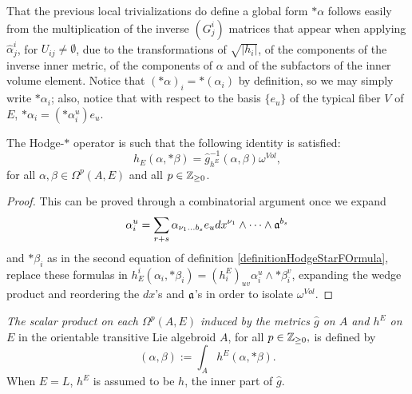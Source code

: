 That the previous local trivializations do define a global form $*\alpha$ follows easily from the multiplication of the inverse $(G^i_j)$ matrices that appear when applying $\hat \alpha^i_j$, for $U_{ij} \neq \emptyset$, due to the transformations of $\sqrt{|h_i|}$, of the components of the inverse inner metric, of the components of $\alpha$ and of the subfactors of the inner volume element. Notice that $(*\alpha)_i = *(\alpha_i)$ by definition, so we may simply write $*\alpha_i$; also, notice that with respect to the basis $\{e_u\}$ of the typical fiber $V$ of $E$, $*\alpha_i = (*\alpha_i^u)e_u$.

\begin{proposition}\label{propositionRelationHodgeStarAndInverseMetricVolume}
The Hodge-$*$ operator is such that the following identity is satisfied:
\begin{equation}
    h_E(\alpha, *\beta) = \hat g_{h^E}^{-1}(\alpha, \beta) \omega^{Vol},
\end{equation}
for all $\alpha, \beta \in \Omega^p(A, E)$ and all $p \in \mathbb{Z}_{\geq 0}$.
\end{proposition}

\begin{proof}
This can be proved through a combinatorial argument once we expand $$\alpha_i^u = \sum_{r+s} \alpha_{\nu_1 \dots b_s} e_u dx^{\nu_1} \wedge \cdots \wedge \mathfrak{a}^{b_s}$$ and $*\beta_i$ as in the second equation of definition \ref{definitionHodgeStarFOrmula}, replace these formulas in $h^i_E(\alpha_i, *\beta_i) = (h^E_i)_{uv} \alpha_i^u \wedge * \beta_i^v$, expanding the wedge product and reordering the $dx$'s and $\mathfrak{a}$'s in order to isolate $\omega^{Vol}$.
\end{proof}

\begin{definition}
\emph{The scalar product on each $\Omega^p(A, E)$ induced by the metrics $\hat g$ on $A$ and $h^E$ on $E$} 
in the orientable transitive Lie algebroid $A$, for all $p \in \mathbb{Z}_{\geq 0},$ is defined by
\begin{equation*}
    (\alpha, \beta) := \int_A h^E(\alpha, *\beta).
\end{equation*}
When $E = L$, $h^E$ is assumed to be $h$, the inner part of $\hat g$.
\end{definition}


